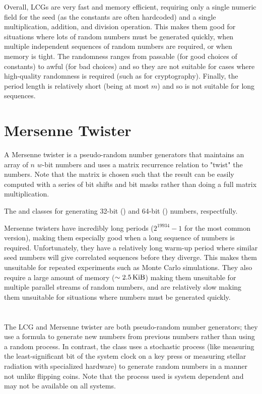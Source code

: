 Overall, LCGs are very fast and memory efficient, requiring only a single numeric field for the seed (as the constants are often hardcoded) and a single multiplication, addition, and division operation.
This makes them good for situations where lots of random numbers must be generated quickly, when multiple independent sequences of random numbers are required, or when memory is tight.
The randomness ranges from passable (for good choices of constants) to awful (for bad choices) and so they are not suitable for cases where high-quality randomness is required (such as for cryptography).
Finally, the period length is relatively short (being at most $m$) and so is not suitable for long sequences.

\section{Mersenne Twister}\label{sec:random-mt}

A Mersenne twister is a pseudo-random number generators that maintains an array of $n$ $w$-bit numbers and uses a matrix recurrence relation to "twist" the numbers.
Note that the matrix is chosen such that the result can be easily computed with a series of bit shifts and bit masks rather than doing a full matrix multiplication.

The  and  classes for generating 32-bit () and 64-bit () numbers, respectfully.

Mersenne twisters have incredibly long periods ($2^{19934} - 1$ for the most common version), making them especially good when a long sequence of numbers is required.
Unfortunately, they have a relatively long warm-up period where similar seed numbers will give correlated sequences before they diverge.
This makes them unsuitable for repeated experiments such as Monte Carlo simulations.
They also require a large amount of memory ($\sim\kb{2.5}$) making them unsuitable for multiple parallel streams of random numbers, and are relatively slow making them unsuitable for situations where numbers must be generated quickly.

\section{}\label{sec:random-device}

The LCG and Mersenne twister are both pseudo-random number generators;
they use a formula to generate new numbers from previous numbers rather than using a random process.
In contrast, the  class uses a stochastic process (like measuring the least-significant bit of the system clock on a key press or measuring stellar radiation with specialized hardware) to generate random numbers in a manner not unlike flipping coins.
Note that the process used is system dependent and may not be available on all systems.


